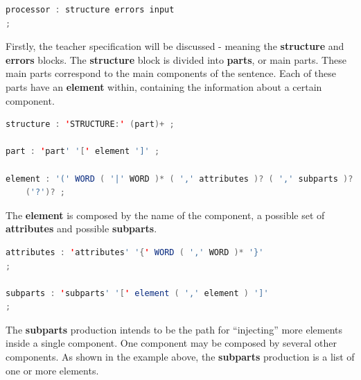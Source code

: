 \begin{center}
\begin{minipage}{8cm}
\begin{lstlisting}[language=java, basicstyle=\small, label={lst:processor_prod}, caption=Processor production]
processor : structure errors input
;
\end{lstlisting}
\end{minipage}
\end{center}

Firstly, the teacher specification will be discussed - meaning the \textbf{structure} and \textbf{errors} blocks.
The \textbf{structure} block is divided into \textbf{parts}, or main parts. These main parts correspond to the main components of the sentence. Each of these parts have an \textbf{element} within, containing the information about a certain component.

\begin{center}
\begin{minipage}{14cm}
\begin{lstlisting}[language=java, basicstyle=\small, label={lst:dsl_struct_prod}, caption=DSL structure/part/element productions]
structure : 'STRUCTURE:' (part)+ ;

part : 'part' '[' element ']' ;

element : '(' WORD ( '|' WORD )* ( ',' attributes )? ( ',' subparts )? ')' 
    ('?')? ;
\end{lstlisting}
\end{minipage}
\end{center}

The \textbf{element} is composed by the name of the component, a possible set of \textbf{attributes} and possible \textbf{subparts}.

\begin{center}
\begin{minipage}{13cm}
\begin{lstlisting}[language=java, basicstyle=\small, label={lst:dsl_attrs_prod}, caption=DSL attributes/subparts productions]
attributes : 'attributes' '{' WORD ( ',' WORD )* '}'
;

subparts : 'subparts' '[' element ( ',' element ) ']'
;
\end{lstlisting}
\end{minipage}
\end{center}

The \textbf{subparts} production intends to be the path for ``injecting'' more elements inside a single component. One component may be composed by several other components. As shown in the example above, the \textbf{subparts} production is a list of one or more elements.

